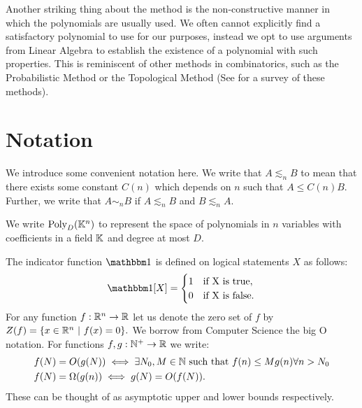 Another striking thing about the method is the non-constructive manner in which the polynomials are usually used. 
We often cannot explicitly find a satisfactory polynomial to use for our purposes, instead we opt to use arguments from Linear Algebra to establish the
existence of a polynomial with such properties. This is reminiscent of other methods in combinatorics, such as the Probabilistic Method or the Topological Method (See \cite{ALON2003} for a survey of these methods). 

\section{Notation}
We introduce some convenient notation here. We write that $A \lesssim_n B$ to mean that there exists some constant
$C(n)$ which depends on $n$ such that $A \leq C(n) B$. Further, we write that $A \sim_n B$ if $A \lesssim_n B$ and $B \lesssim_n A$.

We write $\text{Poly}_D (\mathbb K^n)$ to represent the space of polynomials in $n$ variables with coefficients in a field $\mathbb K$ and degree at most $D$.

The indicator function $\OO$ is defined on logical statements $X$ as follows:
\[
    \OO[X] = 
  \begin{cases}
      1 & \text{if X is true}, \\
      0 & \text{if X is false}.
  \end{cases}  
\]
For any function $f : \mathbb R^n \to \mathbb R$ let us denote the zero set of $f$ by $Z(f) = \{x \in \mathbb R^n \ | \ f(x) = 0\}.$
We borrow from Computer Science the big O notation. For functions $f,g : \mathbb N^+ \to \mathbb R$ we write:
\begin{align*}
    f(N) &= O(g(N)) \iff \exists N_0, M \in \mathbb N \text{ such that } f(n) \leq Mg(n) \forall n > N_0 \\
    f(N) &= \Omega(g(n)) \iff g(N) = O(f(N)).
\end{align*}
These can be thought of as asymptotic upper and lower bounds respectively.